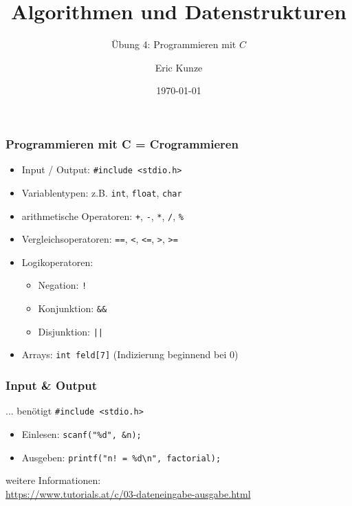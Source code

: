 \documentclass{beamer}
\begin{document}
	
	\title{Algorithmen und Datenstrukturen}
	\subtitle{Übung 4: Programmieren mit $C$}
	\author{Eric Kunze}
	\date{\today}

	\maketitle



\begin{frame}[fragile] \frametitle{Programmieren mit C = Crogrammieren}
	\begin{itemize}
		\item Input / Output: \lstinline{#include <stdio.h>}
		\item Variablentypen: z.B. \lstinline{int}, \lstinline{float}, \lstinline{char}
		\item arithmetische Operatoren: \lstinline{+}, \lstinline{-},  \lstinline{*}, \lstinline{/}, \lstinline{%}
		\item Vergleichsoperatoren: \lstinline{==}, \lstinline{<}, \lstinline{<=}, \lstinline{>}, \lstinline{>=}
		\item Logikoperatoren: 
		\begin{itemize}
			\item Negation: \lstinline{!} 
			\item Konjunktion: \lstinline{&&} 
			\item Disjunktion: \lstinline{||}
		\end{itemize}
		\item Arrays: \lstinline{int feld[7]} (Indizierung beginnend bei 0)
	\end{itemize}
\end{frame}

\begin{frame}[fragile] \frametitle{Input \& Output}
	... benötigt \lstinline|#include <stdio.h>|
	\begin{itemize}
		\item Einlesen: \lstinline{scanf("%d", &n);}
		\item Ausgeben: \lstinline{printf("n! = %d\n", factorial);}
	\end{itemize}

	weitere Informationen: \\
	\url{https://www.tutorials.at/c/03-dateneingabe-ausgabe.html}
			
			
\end{frame}
\end{document}
